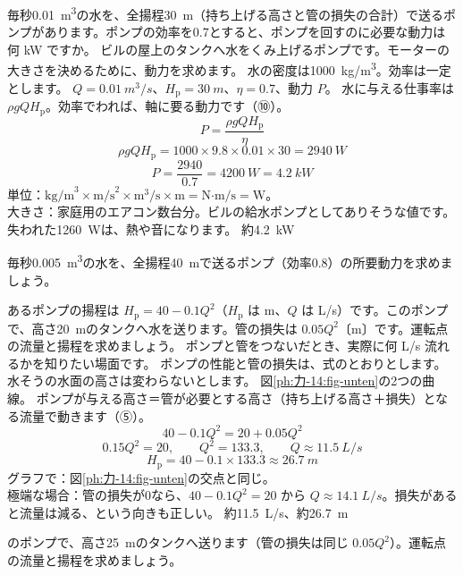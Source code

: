 \begin{phreidai}[ポンプの所要動力]\label{ph:力-14:ex7}
毎秒\qty{0.01}{m^3}の水を、全揚程\qty{30}{m}（持ち上げる高さと管の損失の合計）で送るポンプがあります。ポンプの効率を0.7とすると、ポンプを回すのに必要な動力は何 kW ですか。
\phbamen
ビルの屋上のタンクへ水をくみ上げるポンプです。モーターの大きさを決めるために、動力を求めます。
\phmushi
水の密度は\qty{1000}{kg/m^3}。効率は一定とします。
\phzu
$Q=\qty{0.01}{m^3/s}$、$H_{\mathrm p}=\qty{30}{m}$、$\eta=0.7$、動力 $P$。
\phriyu
水に与える仕事率は $\rho gQH_{\mathrm p}$。効率でわれば、軸に要る動力です（⑩）。
\phtateru
\[P=\frac{\rho gQH_{\mathrm p}}{\eta}\]
\phtoku
\[\rho gQH_{\mathrm p}=1000\times9.8\times0.01\times30=\qty{2940}{W}\]
\[P=\frac{2940}{0.7}=\qty{4200}{W}=\qty{4.2}{kW}\]
\phtashikame
単位：$\text{kg/m}^3\times\text{m/s}^2\times\text{m}^3/\text{s}\times\text{m}=\text{N·m/s}=\text{W}$。\\
大きさ：家庭用のエアコン数台分。ビルの給水ポンプとしてありそうな値です。失われた\qty{1260}{W}は、熱や音になります。
\kotae 約\qty{4.2}{kW}
\end{phreidai}
\begin{jibun}
毎秒\qty{0.005}{m^3}の水を、全揚程\qty{40}{m}で送るポンプ（効率0.8）の所要動力を求めましょう。
\end{jibun}

\begin{phreidai}[ポンプの運転点]\label{ph:力-14:ex8}
あるポンプの揚程は $H_{\mathrm p}=40-0.1Q^2$（$H_{\mathrm p}$ は m、$Q$ は L/s）です。このポンプで、高さ\qty{20}{m}のタンクへ水を送ります。管の損失は $0.05Q^2$〔m〕です。運転点の流量と揚程を求めましょう。
\phbamen
ポンプと管をつないだとき、実際に何 L/s 流れるかを知りたい場面です。
\phmushi
ポンプの性能と管の損失は、式のとおりとします。水そうの水面の高さは変わらないとします。
\phzu
図\ref{ph:力-14:fig-unten}の2つの曲線。
\phriyu
ポンプが与える高さ＝管が必要とする高さ（持ち上げる高さ＋損失）となる流量で動きます（⑤）。
\phtateru
\[40-0.1Q^2=20+0.05Q^2\]
\phtoku
\[0.15Q^2=20,\qquad Q^2=133.3,\qquad Q\approx\qty{11.5}{L/s}\]
\[H_{\mathrm p}=40-0.1\times133.3\approx\qty{26.7}{m}\]
\phtashikame
グラフで：図\ref{ph:力-14:fig-unten}の交点と同じ。\\
極端な場合：管の損失が0なら、$40-0.1Q^2=20$ から $Q\approx\qty{14.1}{L/s}$。損失があると流量は減る、という向きも正しい。
\kotae 約\qty{11.5}{L/s}、約\qty{26.7}{m}
\end{phreidai}
\begin{jibun}
のポンプで、高さ\qty{25}{m}のタンクへ送ります（管の損失は同じ $0.05Q^2$）。運転点の流量と揚程を求めましょう。
\end{jibun}

